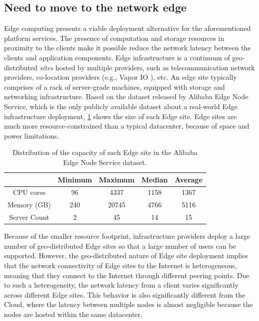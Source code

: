 \subsection{Need to move to the network edge}
Edge computing \cite{ramachandran2021case} presents a viable deployment alternative for the aforementioned platform services. The presence of computation and storage resources in proximity to the clients make it possible reduce the network latency between the clients and application components. Edge infrastructure is a continuum of geo-distributed \emph{sites} hosted by multiple providers, such as telecommunication network providers, co-location providers (e.g., Vapor IO \cite{vaporio}), etc. An edge site typically comprises of a rack of server-grade machines, equipped with storage and networking infrastructure. Based on the dataset \cite{xu2021cloud} released by Alibaba Edge Node Service, which is the only publicly available dataset about a real-world Edge infrastructure deployment, \cref{table:edge_capacity} shows the size of each Edge site. Edge sites are much more resource-constrained than a typical datacenter, because of space and power limitations. 
\begin{table}[h!]
\centering
 \begin{tabular}{||c | c | c | c | c ||} 
 \hline
  & Minimum & Maximum & Median & Average \\ [0.5ex] 
 \hline\hline
 CPU cores      & 96  & 4337 & 1158 & 1367 \\ 
 \hline
 Memory (GB)    &  240 & 20745 & 4766 & 5116\\
 \hline
 Server Count   &  2 & 45 & 14 & 15 \\
 \hline
 \end{tabular}
 \caption{Distribution of the capacity of each Edge site in the Alibaba Edge Node Service dataset.}
  \label{table:edge_capacity}
\end{table}

Because of the smaller resource footprint, infrastructure providers deploy a large number of geo-distributed Edge sites so that a large number of users can be supported. However, the geo-distributed nature of Edge site deployment implies that the network connectivity of Edge sites to the Internet is heterogeneous, meaning that they connect to the Internet through different peering points. Due to such a heterogeneity, the network latency from a client varies significantly across different Edge sites. This behavior is also significantly different from the Cloud, where the latency between multiple nodes is almost negligible because the nodes are hosted within the same datacenter. 

